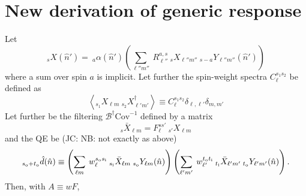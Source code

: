 \documentclass{article}
\newcommand{\Cov}[0]{{\textrm{Cov}}}
\newcommand{\si}[0]{{s_{\rm i}}}
\newcommand{\ti}[0]{{t_{\rm i}}}
\newcommand{\so}[0]{{s_{\rm o}}}
\renewcommand{\to}[0]{{t_{\rm o}}}
\newcommand{\av}[1]{\left\langle #1 \right\rangle}
\newcommand{\JC}[1]{\color{red}JC: #1\color{black}}
\newcommand{\hn}[0]{\hat n}
\begin{document}
\section{New derivation of generic response}
Let 
\begin{equation}
	_{s}X(\hn') = \:_{a}\alpha(\hn') \left( \sum_{\ell'' m''}\: R_{\ell''}^{a, s} \:_sX_{\ell'' m''}\: _{s- a}Y_{\ell'' m''}(\hn')\right) 
\end{equation}
where a sum over spin $a$ is implicit.
Let further the spin-weight spectra $C_\ell^{s_1s_2}$ be defined as
\begin{equation}
	\av{_{s_1}X_{\ell m}\: _{s_2}X^\dagger_{\ell' m'}} \equiv C_\ell^{s_1s_2} \delta_{\ell, \ell'} \delta_{m, m'}
\end{equation}
Let further be the filtering $\mathcal B^\dagger \Cov^{-1}$ defined by a matrix
\begin{equation}
_s 	\bar X_{\ell m} = F^{s s'}_\ell \:_{s'} X_{\ell m}
\end{equation}
and the QE be (\JC{NB: not exactly as above})
\begin{equation}
 _{\so + \to}\hat d(\hn) \equiv  \left(\sum_{\ell m}\: w^{\so\si}_\ell \:_{\si} \bar X_{\ell m} \:_\so Y_{\ell m}(\hn)\right)\left(\sum_{\ell' m'}\:w^{\to\ti}_{\ell'}  \:_{\ti} \bar X_{\ell' m'} \:_\to Y_{\ell' m'}(\hn)\right).
\end{equation}
Then, with $A \equiv wF$,
\end{document}
